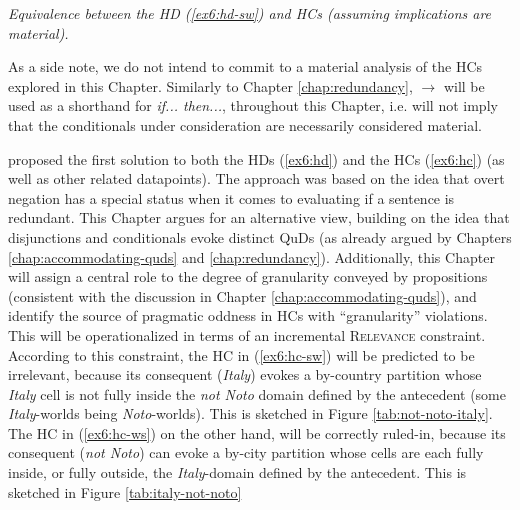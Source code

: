 \begin{exe}
	\ex \textit{Equivalence between the HD (\ref{ex6:hd-sw}) and HCs (assuming implications are material).} \label{ex6:hd-hc-derivation}
	\begin{xlist}
	\end{xlist}
\end{exe}

As a side note, we do not intend to commit to a material analysis of the HCs explored in this Chapter. Similarly to Chapter \ref{chap:redundancy}, $\rightarrow$ will be used as a shorthand for \textit{if... then...}, throughout this Chapter, i.e. will not imply that the conditionals under consideration are necessarily considered material.



\citet{Kalomoiros2024} proposed the first solution to both the HDs (\ref{ex6:hd}) and  the HCs (\ref{ex6:hc}) (as well as other related datapoints). The approach was based on the idea that overt negation has a special status when it comes to evaluating if a sentence is redundant. This Chapter argues for an alternative view, building on the idea that disjunctions and conditionals evoke distinct QuDs (as already argued by Chapters \ref{chap:accommodating-quds} and \ref{chap:redundancy}). Additionally, this Chapter will assign a central role to the degree of granularity conveyed by propositions (consistent with the discussion in Chapter \ref{chap:accommodating-quds}), and identify the source of pragmatic oddness in HCs with ``granularity'' violations. This will be operationalized in terms of an incremental \textsc{Relevance} constraint. According to this constraint, the HC in (\ref{ex6:hc-sw}) will be predicted to be irrelevant, because its consequent (\textit{Italy}) evokes a by-country partition whose \textit{Italy} cell is not fully inside the \textit{not Noto} domain defined by the antecedent (some \textit{Italy}-worlds being \textit{Noto}-worlds). This is sketched in Figure \ref{tab:not-noto-italy}. The HC in (\ref{ex6:hc-ws}) on the other hand, will be correctly ruled-in, because its consequent (\textit{not Noto}) can evoke a by-city partition whose cells are each fully inside, or fully outside, the \textit{Italy}-domain defined by the antecedent. This is sketched in Figure \ref{tab:italy-not-noto}

